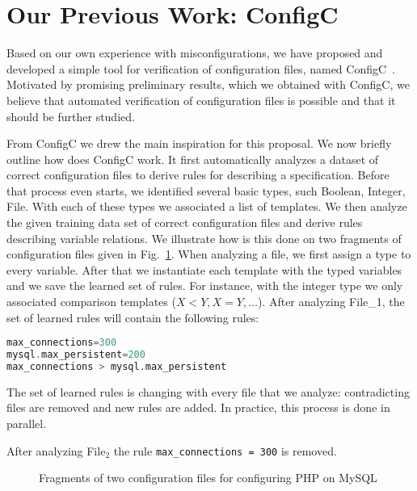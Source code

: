 \section{Our Previous Work: ConfigC}
\label{sec:prelim}

Based on our own experience with misconfigurations,
we have proposed and developed a simple tool for verification of 
configuration files, named
ConfigC~\cite{santolucitoCAV}. Motivated by promising preliminary
results, which we obtained with ConfigC, we believe that automated 
verification of configuration files is possible and that it should be further studied.

From ConfigC we drew the main inspiration for this proposal. We now briefly
outline how does ConfigC work. It first automatically
analyzes a dataset of correct configuration files to derive
 rules for describing a specification. Before that process even starts,
we identified several basic types, 
such Boolean, Integer, File. With each of these types we associated a 
list of templates. We then analyze the given training data set of 
correct configuration files and derive rules describing variable 
relations. We illustrate how is this done on two fragments of 
configuration files given in Fig.~\ref{fig:twoFiles}.  When analyzing
a file, we first assign a type to every 
variable. After that we instantiate each template with the typed 
variables and we save the learned set 
of rules. For instance, with the integer type we only associated comparison templates ($X < Y, X = Y, \ldots$). After 
analyzing File\_1, the set of learned rules will contain the following rules:
\begin{lstlisting}[language=C, xleftmargin=.01\textwidth]
max_connections=300
mysql.max_persistent=200
max_connections > mysql.max_persistent
\end{lstlisting}
The set of learned rules is changing with every file that we analyze: contradicting 
files are removed and new rules are added. In practice, this process is done 
in parallel. 

After analyzing File$_2$ the rule \texttt{max\_connections = 300} is removed. 

\begin{figure}
	\centering
\begin{minipage}{0.9\textwidth}
\begin{parcolumns}{2}


\colplacechunks
\end{parcolumns}
\end{minipage}
	\caption{Fragments of two configuration files for configuring PHP on MySQL}
	\label{fig:twoFiles}
\end{figure}


